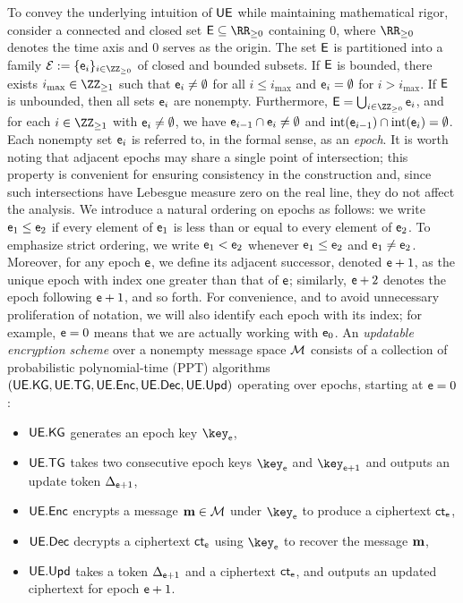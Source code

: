 \documentclass{fundam}
\begin{document}
To convey the underlying intuition of $\mathsf{UE}$ while maintaining mathematical rigor, consider a connected and closed set $\Epoch \subseteq \RR_{\geq 0}$ containing $0$, where $\RR_{\geq 0}$ denotes the time axis and $0$ serves as the origin. The set $\mathsf{E}$ is partitioned into a family $\mathcal{E} := \{\epoch_i\}_{i \in \ZZ_{\geq 0}}$ of closed and bounded subsets. If $\mathsf{E}$ is bounded, there exists $i_{\max} \in \ZZ_{\geq 1}$ such that $\mathsf{e}_i \neq \emptyset$ for all $i \leq i_{\max}$ and $\mathsf{e}_i = \emptyset$ for $i > i_{\max}$. If $\mathsf{E}$ is unbounded, then all sets $\mathsf{e}_i$ are nonempty. Furthermore, $\Epoch = \bigcup_{i \in \ZZ_{\geq 0}} \epoch_i$, and for each $i \in \ZZ_{\geq 1}$ with $\mathsf{e}_i \neq \emptyset$, we have $\mathsf{e}_{i-1} \cap \mathsf{e}_i \neq \emptyset$ and $\operatorname{int}(\mathsf{e}_{i-1}) \cap \operatorname{int}(\mathsf{e}_i) = \emptyset$. Each nonempty set $\mathsf{e}_i$ is referred to, in the formal sense, as an \emph{epoch}. It is worth noting that adjacent epochs may share a single point of intersection; this property is convenient for ensuring consistency in the construction and, since such intersections have Lebesgue measure zero on the real line, they do not affect the analysis. We introduce a natural ordering on epochs as follows: we write $\mathsf{e}_1 \leq \mathsf{e}_2$ if every element of $\mathsf{e}_1$ is less than or equal to every element of $\mathsf{e}_2$. To emphasize strict ordering, we write $\mathsf{e}_1 < \mathsf{e}_2$ whenever $\mathsf{e}_1 \leq \mathsf{e}_2$ and $\mathsf{e}_1 \neq \mathsf{e}_2$. Moreover, for any epoch $\mathsf{e}$, we define its adjacent successor, denoted $\mathsf{e}+1$, as the unique epoch with index one greater than that of $\mathsf{e}$; similarly, $\mathsf{e}+2$ denotes the epoch following $\mathsf{e}+1$, and so forth. For convenience, and to avoid unnecessary proliferation of notation, we will also identify each epoch with its index; for example, $\mathsf{e}=0$ means that we are actually working with $\mathsf{e}_0$. An \textit{updatable encryption scheme} over a nonempty message space $\mathcal{M}$ consists of a collection of probabilistic polynomial-time (PPT) algorithms $(\mathsf{UE.KG}, \mathsf{UE.TG}, \mathsf{UE.Enc}, \mathsf{UE.Dec}, \mathsf{UE.Upd})$ operating over epochs, starting at $\mathsf{e} = 0$:
\begin{itemize}
	\item $\mathsf{UE.KG}$ generates an epoch key $\key_{\epoch}$,
	\item $\mathsf{UE.TG}$ takes two consecutive epoch keys $\key_{\epoch}$ and $\key_{\epoch+1}$ and outputs an update token $\Delta_{\mathsf{e}+1}$,
	\item $\mathsf{UE.Enc}$ encrypts a message $\mathbf{m} \in \mathcal{M}$ under $\key_{\epoch}$ to produce a ciphertext $\mathsf{ct}_{\mathsf{e}}$,
	\item $\mathsf{UE.Dec}$ decrypts a ciphertext $\mathsf{ct}_{\mathsf{e}}$ using $\key_{\epoch}$ to recover the message $\mathbf{m}$,
	\item $\mathsf{UE.Upd}$ takes a token $\Delta_{\mathsf{e}+1}$ and a ciphertext $\mathsf{ct}_{\mathsf{e}}$, and outputs an updated ciphertext for epoch $\mathsf{e}+1$.
\end{itemize}
\end{document}
